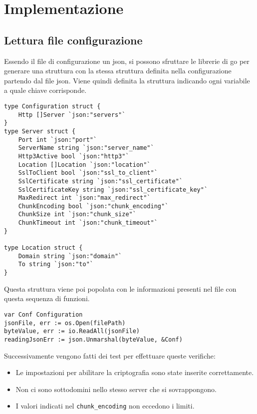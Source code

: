 \section{Implementazione}
\subsection{Lettura file configurazione}
Essendo il file di configurazione un json, si possono sfruttare le librerie di go per generare una struttura con la stessa struttura definita nella configurazione partendo dal file json. Viene quindi definita la struttura indicando ogni variabile a quale chiave corrisponde.
\begin{lstlisting}[language=Golang]
type Configuration struct {
	Http []Server `json:"servers"`
}
type Server struct {
	Port int `json:"port"`
	ServerName string `json:"server_name"`
	Http3Active bool `json:"http3"`
	Location []Location `json:"location"`
	SslToClient bool `json:"ssl_to_client"`
	SslCertificate string `json:"ssl_certificate"`
	SslCertificateKey string `json:"ssl_certificate_key"`
	MaxRedirect int `json:"max_redirect"`
	ChunkEncoding bool `json:"chunk_encoding"`
	ChunkSize int `json:"chunk_size"`
	ChunkTimeout int `json:"chunk_timeout"`
}

type Location struct {
	Domain string `json:"domain"`
	To string `json:"to"`
}
\end{lstlisting}
Questa struttura viene poi popolata con le informazioni presenti nel file con questa sequenza di funzioni.
\begin{lstlisting}[language=Golang]
var Conf Configuration
jsonFile, err := os.Open(filePath)
byteValue, err := io.ReadAll(jsonFile)
readingJsonErr := json.Unmarshal(byteValue, &Conf)
\end{lstlisting}
Successivamente vengono fatti dei test per effettuare queste verifiche:
\begin{itemize}
  \item Le impostazioni per abilitare la criptografia sono state inserite correttamente.
  \item Non ci sono sottodomini nello stesso server che si sovrappongono.
  \item I valori indicati nel \texttt{chunk\_encoding} non eccedono i limiti.
\end{itemize}

